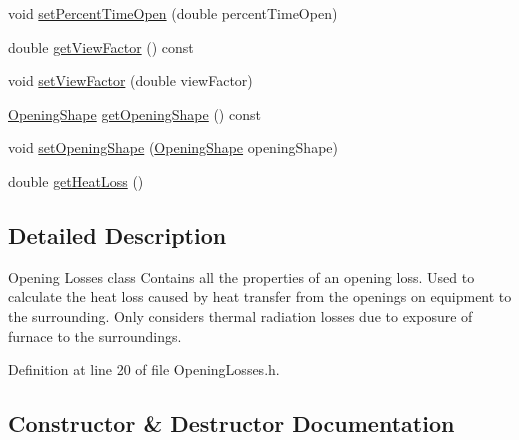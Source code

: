 \begin{DoxyCompactItemize}
\item 
void \hyperlink{class_opening_losses_a889b6aa25bf6d8fc8fb284ec0c2a1625}{set\+Percent\+Time\+Open} (double percent\+Time\+Open)
\item 
double \hyperlink{class_opening_losses_ae6633fab7a941e00b9770bee6a3af34d}{get\+View\+Factor} () const
\item 
void \hyperlink{class_opening_losses_a4e6c6f1549e01cd4b82b7505e403d643}{set\+View\+Factor} (double view\+Factor)
\item 
\hyperlink{class_opening_losses_a57f9759b6fd72a1b75aa885800e26157}{Opening\+Shape} \hyperlink{class_opening_losses_a5046cd699178e4edca774d0d0da7965a}{get\+Opening\+Shape} () const
\item 
void \hyperlink{class_opening_losses_a163778704e5bdd1809d05118504da027}{set\+Opening\+Shape} (\hyperlink{class_opening_losses_a57f9759b6fd72a1b75aa885800e26157}{Opening\+Shape} opening\+Shape)
\item 
double \hyperlink{class_opening_losses_a38112eb408f72e252b42a68a41a25d0f}{get\+Heat\+Loss} ()
\end{DoxyCompactItemize}


\subsection{Detailed Description}
Opening Losses class Contains all the properties of an opening loss. Used to calculate the heat loss caused by heat transfer from the openings on equipment to the surrounding. Only considers thermal radiation losses due to exposure of furnace to the surroundings. 

Definition at line 20 of file Opening\+Losses.\+h.



\subsection{Constructor \& Destructor Documentation}
\mbox{\label{class_opening_losses_a366fd35fabdebffee916dee77d072543}} 
